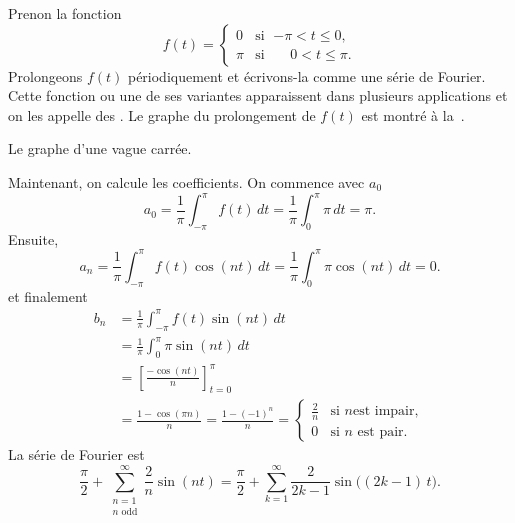 \begin{example}
Prenon la fonction
\begin{equation*}
f(t) =
\begin{cases}
0 & \text{si } \;{-\pi} < t \leq 0 , \\
\pi & \text{si } \;\phantom{-}0 < t \leq \pi .
\end{cases}
\end{equation*}
\nopagebreak[4]%
Prolongeons $f(t)$ périodiquement et écrivons-la comme une série de Fourier.  Cette fonction ou une de ses variantes apparaissent dans plusieurs applications et on les appelle des 
\emph{}.  Le graphe du prolongement de $f(t)$ est montré à la~.

\begin{myfig}
\capstart
{}
\caption{Le graphe d'une vague carrée.\label{ts:squarewavefig}}
\end{myfig}

Maintenant, on calcule les coefficients. On commence avec $a_0$
\begin{equation*}
a_0 = \frac{1}{\pi} \int_{-\pi}^\pi f(t) \,dt
= \frac{1}{\pi} \int_{0}^\pi \pi \,dt = \pi .
\end{equation*}
Ensuite,
\begin{equation*}
a_n = \frac{1}{\pi} \int_{-\pi}^\pi f(t) \cos (nt) \,dt 
= \frac{1}{\pi} \int_{0}^\pi \pi \cos (nt) \,dt = 0 .
\end{equation*}
et finalement
\begin{equation*}
\begin{split}
b_n & = \frac{1}{\pi} \int_{-\pi}^\pi f(t) \sin (nt) \,dt \\
& = \frac{1}{\pi} \int_{0}^\pi \pi \sin (nt) \,dt \\
& = \left[ \frac{- \cos (nt)}{n} \right]_{t=0}^\pi \\
& = \frac{1 - \cos (\pi n)}{n}
= \frac{1 - {(-1)}^n}{n}
=
\begin{cases}
\frac{2}{n} & \text{si } n \text{est impair} , \\
0 & \text{si } n \text{ est pair} .
\end{cases}
\end{split}
\end{equation*}
La série de Fourier est
\begin{equation*}
\frac{\pi}{2} +  \sum_{\substack{n=1\\n \text{ odd}}}^\infty
\frac{2}{n} 
\sin (n t)
=
\frac{\pi}{2} + \sum_{k=1}^\infty
\frac{2}{2k-1} 
\sin \bigl( (2k-1)\, t \bigr) .
\end{equation*}


\end{example}
